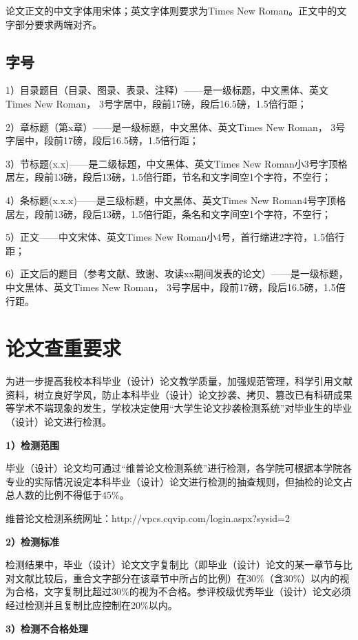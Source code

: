 论文正文的中文字体用宋体；英文字体则要求为Times New Roman。正文中的文字部分要求两端对齐。

\subsection{字号}

1）目录题目（目录、图录、表录、注释）——是一级标题，中文黑体、英文Times New Roman， 3号字居中，段前17磅，段后16.5磅，1.5倍行距；

2）章标题（第x章）——是一级标题，中文黑体、英文Times New Roman， 3号字居中，段前17磅，段后16.5磅，1.5倍行距；

3）节标题(x.x)——是二级标题，中文黑体、英文Times New Roman小3号字顶格居左，段前13磅，段后13磅，1.5倍行距，节名和文字间空1个字符，不空行；

4）条标题(x.x.x)——是三级标题，中文黑体、英文Times New Roman4号字顶格居左，段前13磅，段后13磅，1.5倍行距，条名和文字间空1个字符，不空行；

5）正文——中文宋体、英文Times New Roman小4号，首行缩进2字符，1.5倍行距；

6）正文后的题目（参考文献、致谢、攻读xx期间发表的论文）——是一级标题，中文黑体、英文Times New Roman， 3号字居中，段前17磅，段后16.5磅，1.5倍行距。


\section{论文查重要求}

为进一步提高我校本科毕业（设计）论文教学质量，加强规范管理，科学引用文献资料，树立良好学风，防止本科毕业（设计）论文抄袭、拷贝、篡改已有科研成果等学术不端现象的发生，学校决定使用“大学生论文抄袭检测系统”对毕业生的毕业（设计）论文进行检测。

\textbf{1）检测范围}

毕业（设计）论文均可通过“维普论文检测系统”进行检测，各学院可根据本学院各专业的实际情况设定本科毕业（设计）论文进行检测的抽查规则，但抽检的论文占总人数的比例不得低于45\%。

维普论文检测系统网址：http://vpcs.cqvip.com/login.aspx?sysid=2

\textbf{2）检测标准}

检测结果中，毕业（设计）论文文字复制比（即毕业（设计）论文的某一章节与比对文献比较后，重合文字部分在该章节中所占的比例）在30\%（含30\%）以内的视为合格，文字复制比超过30\%的视为不合格。参评校级优秀毕业（设计）论文必须经过检测并且复制比应控制在20\%以内。

\textbf{3）检测不合格处理}

